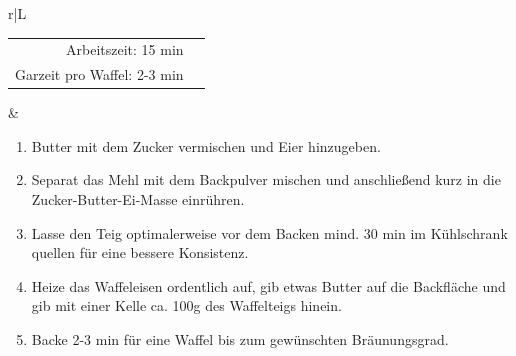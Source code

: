 \documentclass[a4paper, 12pt]{scrbook} 								%
\numberwithin{equation}{section} 									%
\begin{document}
\begin{tabularx}{\textwidth}{r|L}
\begin{tabular}[t]{rr}
				Arbeitszeit: 15 min	\\
				Garzeit pro Waffel: 2-3 min	\\
			\end{tabular}			&	\begin{enumerate}[nosep]
											\item Butter mit dem Zucker vermischen und Eier hinzugeben.
											\item Separat das Mehl mit dem Backpulver mischen und anschließend kurz in die Zucker-Butter-Ei-Masse einrühren.
											\item Lasse den Teig optimalerweise vor dem Backen mind. 30 min im Kühlschrank quellen für eine bessere Konsistenz.
											\item Heize das Waffeleisen ordentlich auf, gib etwas Butter auf die Backfläche und gib mit einer Kelle ca. 100g des Waffelteigs hinein.
											\item Backe 2-3 min für eine Waffel bis zum gewünschten Bräunungsgrad.
										\end{enumerate}	\\
		\end{tabularx}
		\newpage


\end{document}
